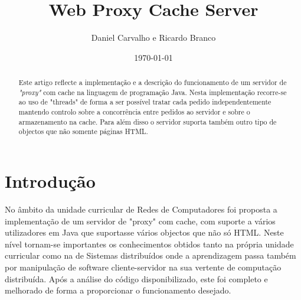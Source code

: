\documentclass{llncs}
\begin{document}
\mainmatter
\title{Web Proxy Cache Server}


\author{Daniel Carvalho e Ricardo Branco}



\date{\today}


\maketitle
\begin{abstract}
  Este artigo reflecte a implementação e a descrição do funcionamento de um servidor de \textit{"proxy"} com cache na 
  linguagem de programação Java. Nesta implementação recorre-se ao uso de 
  "threads" de forma a ser possível tratar cada pedido independentemente mantendo 
  controlo sobre a concorrência entre pedidos ao servidor e sobre o armazenamento na 
  cache. Para além disso o servidor suporta também outro tipo de objectos que 
  não somente páginas HTML.
\end{abstract}

\section{Introdução}

No âmbito da unidade curricular de Redes de Computadores foi proposta a 
implementação de um servidor de "proxy" com cache, com suporte a vários 
utilizadores em Java que suportasse vários objectos que não só HTML. Neste nível 
tornam-se importantes os conhecimentos obtidos tanto na própria unidade curricular 
como na de Sistemas distribuídos onde a aprendizagem passa também por 
manipulação de software cliente-servidor na sua vertente de computação 
distribuída. Após a análise do código disponibilizado, este foi completo e 
melhorado de forma a proporcionar o funcionamento desejado.
\end{document}
